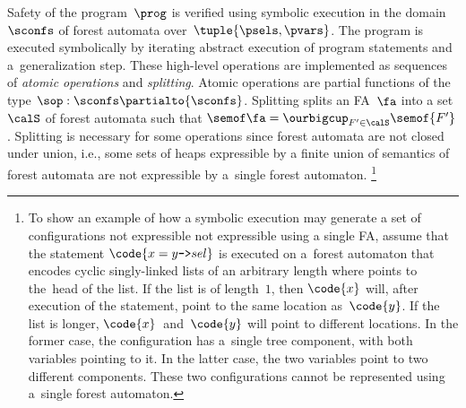 Safety of the program~$\prog$ is verified using symbolic execution in the
domain~$\sconfs$ of forest automata over~$\tuple{\psels,\pvars}$.
%
The program is executed symbolically by iterating abstract execution of program statements and 
a~generalization step.
%
%
These high-level operations
are implemented as sequences of \emph{atomic operations} and \emph{splitting}.
Atomic operations are partial functions of the type $\sop:\sconfs\partialto {\sconfs}$.
%
Splitting splits an FA~$\fa$ into a set $\calS$ of forest automata such that $\semof\fa =\ourbigcup_{F' \in \calS} \semof{F'}$.
%
Splitting is necessary for some operations since forest automata are not
closed under union, i.e.,
some sets of heaps expressible by a finite union of semantics of forest automata 
are not expressible by a~single forest automaton.%
%
\footnote{
To show an example of how a symbolic execution may generate a set of configurations not expressible not expressible using a single FA, assume that the statement $\code{x = y\text{\texttt{->}}sel}$ is
executed on a~forest automaton that encodes
cyclic singly-linked lists of an arbitrary length where  points to
the~head of the list.
%
If the list is of length~$1$, then $\code{x}$ will, after execution of the
statement, point to the same location
as~$\code{y}$.
If the list is longer, $\code{x}$~and~$\code{y}$ will point to different
locations.
%
In the former case, the configuration has a~single tree component, with both variables pointing to it.
In the latter case, the two variables point to two different components.
%
These two configurations cannot be represented using a~single forest automaton.
}


